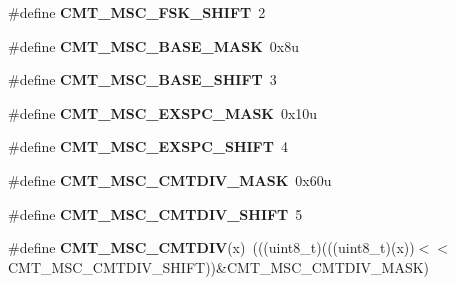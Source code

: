 \begin{DoxyCompactItemize}
\item 
\#define {\bfseries C\+M\+T\+\_\+\+M\+S\+C\+\_\+\+F\+S\+K\+\_\+\+S\+H\+I\+FT}~2\hypertarget{group__CMT__Register__Masks_ga73422722bbae07a50d0b2b473f5f9417}{}\label{group__CMT__Register__Masks_ga73422722bbae07a50d0b2b473f5f9417}

\item 
\#define {\bfseries C\+M\+T\+\_\+\+M\+S\+C\+\_\+\+B\+A\+S\+E\+\_\+\+M\+A\+SK}~0x8u\hypertarget{group__CMT__Register__Masks_gac099af54e9456cad9c3343184d3e041a}{}\label{group__CMT__Register__Masks_gac099af54e9456cad9c3343184d3e041a}

\item 
\#define {\bfseries C\+M\+T\+\_\+\+M\+S\+C\+\_\+\+B\+A\+S\+E\+\_\+\+S\+H\+I\+FT}~3\hypertarget{group__CMT__Register__Masks_ga3ddb10ae744a6e2149a0d0185a796571}{}\label{group__CMT__Register__Masks_ga3ddb10ae744a6e2149a0d0185a796571}

\item 
\#define {\bfseries C\+M\+T\+\_\+\+M\+S\+C\+\_\+\+E\+X\+S\+P\+C\+\_\+\+M\+A\+SK}~0x10u\hypertarget{group__CMT__Register__Masks_gafeb71169b6c47237583101487f6412e1}{}\label{group__CMT__Register__Masks_gafeb71169b6c47237583101487f6412e1}

\item 
\#define {\bfseries C\+M\+T\+\_\+\+M\+S\+C\+\_\+\+E\+X\+S\+P\+C\+\_\+\+S\+H\+I\+FT}~4\hypertarget{group__CMT__Register__Masks_ga7a71704451408ca7e8c8802fa72d4e4d}{}\label{group__CMT__Register__Masks_ga7a71704451408ca7e8c8802fa72d4e4d}

\item 
\#define {\bfseries C\+M\+T\+\_\+\+M\+S\+C\+\_\+\+C\+M\+T\+D\+I\+V\+\_\+\+M\+A\+SK}~0x60u\hypertarget{group__CMT__Register__Masks_gab663f14909462192c6e432c7bd0e56bf}{}\label{group__CMT__Register__Masks_gab663f14909462192c6e432c7bd0e56bf}

\item 
\#define {\bfseries C\+M\+T\+\_\+\+M\+S\+C\+\_\+\+C\+M\+T\+D\+I\+V\+\_\+\+S\+H\+I\+FT}~5\hypertarget{group__CMT__Register__Masks_gad2d262cf3ba8ccd189bd321219579c52}{}\label{group__CMT__Register__Masks_gad2d262cf3ba8ccd189bd321219579c52}

\item 
\#define {\bfseries C\+M\+T\+\_\+\+M\+S\+C\+\_\+\+C\+M\+T\+D\+IV}(x)~(((uint8\+\_\+t)(((uint8\+\_\+t)(x))$<$$<$C\+M\+T\+\_\+\+M\+S\+C\+\_\+\+C\+M\+T\+D\+I\+V\+\_\+\+S\+H\+I\+FT))\&C\+M\+T\+\_\+\+M\+S\+C\+\_\+\+C\+M\+T\+D\+I\+V\+\_\+\+M\+A\+SK)\hypertarget{group__CMT__Register__Masks_ga4fb2c3b2ee10cfe9b48db2aa9e08551a}{}\label{group__CMT__Register__Masks_ga4fb2c3b2ee10cfe9b48db2aa9e08551a}


\end{DoxyCompactItemize}
